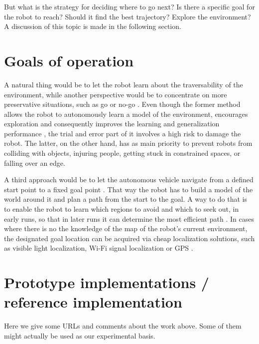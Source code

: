 \documentclass[12pt,a4paper]{report}
\newcommand{\acronym}{\MakeUppercase}
\begin{document}
	
	But what is the strategy for deciding where to go next? Is there a specific goal 
	for the robot to reach? Should it find the best trajectory? Explore the 
	environment? A discussion of this topic is made in the following section.
	\\
	
	\section{Goals of operation}
	\label{sec:bg:goals}
	
	A natural thing would be to let the robot learn about the traversability 
	of the environment, while another perspective would be to concentrate on more 
	preservative situations, such as go or no-go \cite{Hirose}. Even though the 
	former method allows the robot to autonomously learn a model of the environment,
	encourages exploration and consequently improves the learning and generalization 
	performance \cite{Zhelo}, the trial and error part of it involves a high risk to 
	damage the robot. The latter, on the other hand, has as main priority to prevent 
	robots from colliding with objects, injuring people, getting stuck in constrained 
	spaces, or falling over an edge. 
	\par
	A third approach would be to let the autonomous vehicle navigate from a defined 
	start point to a fixed goal	point \cite{Shneier, Zhelo}. That way the robot has 
	to build a model of the world around it and plan a path from the start to the 
	goal. A way to do that is to enable the robot to learn which regions to avoid 
	and which to seek out, in early runs, so that in later runs it can determine the 
	most efficient path \cite{Shneier}. In cases where there is no the knowledge of 
	the map of the robot's current environment, the designated goal location can be 
	acquired via cheap localization solutions, such as visible light localization, 
	Wi-Fi signal localization or \acronym{gps} \cite{Zhelo}.
	\\
	
	\section{Prototype implementations / reference implementation}
	\label{sec:bg:code}

	Here we give some \acronym{url}s and comments about the work above. Some of them 
	might actually be used as our experimental basis.
	\\
		
\end{document}
